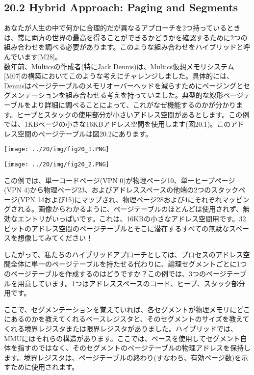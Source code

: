 \hypertarget{hybrid-approach-paging-and-segments}{%
\subsection*{20.2 Hybrid Approach: Paging and
Segments}\label{hybrid-approach-paging-and-segments}}

あなたが人生の中で何かに合理的だが異なるアプローチを2つ持っているときは、常に両方の世界の最高を得ることができるかどうかを確認するために2つの組み合わせを調べる必要があります。このような組み合わせをハイブリッドと呼んでいます{[}M28{]}。\\
数年前、Multicsの作成者(特にJack
Dennis)は、Multics仮想メモリシステム{[}M07{]}の構築においてこのような考えにチャレンジしました。具体的には、Dennisはページテーブルのメモリオーバーヘッドを減らすためにページングとセグメンテーションを組み合わせる考えを持っていました。典型的な線形ページテーブルをより詳細に調べることによって、これがなぜ機能するのかが分かります。ヒープとスタックの使用部分が小さいアドレス空間があるとします。この例では、1KBページの小さな16KBアドレス空間を使用します(図20.1)。このアドレス空間のページテーブルは図20.2にあります。

\texttt{[image: ../20/img/fig20\_1.PNG]}

\texttt{[image: ../20/img/fig20\_2.PNG]}

この例では、単一コードページ(VPN 0)が物理ページ10、単一ヒープページ(VPN
4)から物理ページ23、およびアドレススペースの他端の2つのスタックページ(VPN
14および15)にマップされ、物理ページ28および4にそれぞれマッピングされる。画像からわかるように、ページテーブルのほとんどは使用されず、無効なエントリがいっぱいです。これは、16KBの小さなアドレス空間用です。32ビットのアドレス空間のページテーブルとそこに潜在するすべての無駄なスペースを想像してみてください！

したがって、私たちのハイブリッドアプローチとしては、プロセスのアドレス空間全体に単一のページテーブルを持たせる代わりに、論理セグメントごとに1つのページテーブルを作成するのはどうですか？この例では、3つのページテーブルを用意しています。1つはアドレススペースのコード、ヒープ、スタック部分用です。

ここで、セグメンテーションを覚えていれば、各セグメントが物理メモリにどこにあるのかを教えてくれるベースレジスタと、そのセグメントのサイズを教えてくれる境界レジスタまたは限界レジスタがありました。ハイブリッドでは、MMUにはそれらの構造があります。ここでは、ベースを使用してセグメント自体を指すのではなく、そのセグメントのページテーブルの物理アドレスを保持します。境界レジスタは、ページテーブルの終わり(すなわち、有効ページ数)を示すために使用されます。


